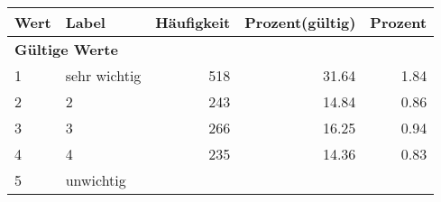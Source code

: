      \begin{longtable}{lXrrr}
     \toprule
     \textbf{Wert} & \textbf{Label} & \textbf{Häufigkeit} & \textbf{Prozent(gültig)} & \textbf{Prozent} \\
     \endhead
     \midrule
     \multicolumn{5}{l}{\textbf{Gültige Werte}}\\

     1 &
     \multicolumn{1}{X}{ sehr wichtig   } &


       \num{518} &
       \num[round-mode=places,round-precision=2]{31,64} &
         \num[round-mode=places,round-precision=2]{1,84} \\

     2 &
     \multicolumn{1}{X}{ 2   } &


       \num{243} &
       \num[round-mode=places,round-precision=2]{14,84} &
         \num[round-mode=places,round-precision=2]{0,86} \\

     3 &
     \multicolumn{1}{X}{ 3   } &


       \num{266} &
       \num[round-mode=places,round-precision=2]{16,25} &
         \num[round-mode=places,round-precision=2]{0,94} \\

     4 &
     \multicolumn{1}{X}{ 4   } &


       \num{235} &
       \num[round-mode=places,round-precision=2]{14,36} &
         \num[round-mode=places,round-precision=2]{0,83} \\

     5 &
     \multicolumn{1}{X}{ unwichtig   } &



\end{longtable}
